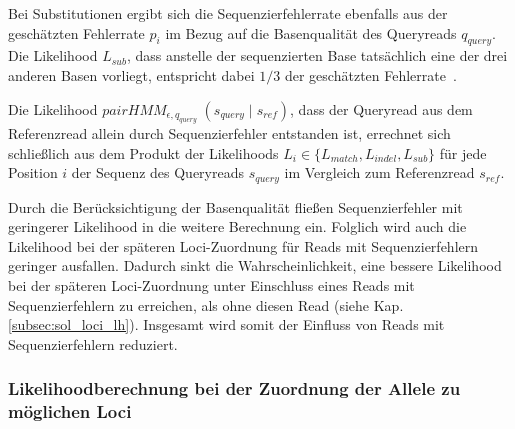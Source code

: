 Bei Substitutionen ergibt sich die Sequenzierfehlerrate ebenfalls aus der geschätzten Fehlerrate $p_{i}$ im Bezug auf die Basenqualität des Queryreads $q_{query}$. Die Likelihood $L_{sub}$, dass anstelle der sequenzierten Base tatsächlich eine der drei anderen Basen vorliegt, entspricht dabei $ 1/3 $ der geschätzten Fehlerrate~\cite{kuhner_2014}.
\vspace{-0.5cm}
\begin{center}
\end{center}

Die Likelihood $ pairHMM_{\epsilon, q_{query}} \;(s_{query}\;|\; s_{ref}) $, dass der Queryread aus dem Referenzread allein durch Sequenzierfehler entstanden ist, errechnet sich schließlich aus dem Produkt der Likelihoods $ L_{i} \in \{L_{match}, L_{indel}, L_{sub}\} $ für jede Position $ i $ der Sequenz des Queryreads $ s_{query} $ im Vergleich zum Referenzread $ s_{ref} $.
\vspace{-0.5cm}
\begin{center}
\end{center}
 
Durch die Berücksichtigung der Basenqualität fließen Sequenzierfehler mit geringerer Likelihood in die weitere Berechnung ein. Folglich wird auch die Likelihood bei der späteren Loci-Zuordnung für Reads mit Sequenzierfehlern geringer ausfallen. Dadurch sinkt die Wahrscheinlichkeit, eine bessere Likelihood bei der späteren Loci-Zuordnung unter Einschluss eines Reads mit Sequenzierfehlern zu erreichen, als ohne diesen Read (siehe Kap. \ref{subsec:sol_loci_lh}). Insgesamt wird somit der Einfluss von Reads mit Sequenzierfehlern reduziert.

\subsubsection{Likelihoodberechnung bei der Zuordnung der Allele zu möglichen Loci} \label{pHMM_loci}

